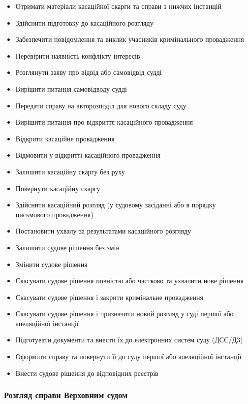 \documentclass{article}
\begin{document}
\begin{itemize}
    \item Отримати матеріали касаційної скарги та справи з нижчих інстанцій
    \item Здійснити підготовку до касаційного розгляду
    \item Забезпечити повідомлення та виклик учасників кримінального провадження
    \item Перевірити наявність конфлікту інтересів
    \item Розглянути заяву про відвід або самовідвід судді
    \item Вирішити питання самовідводу судді
    \item Передати справу на авторозподіл для нового складу суду
    \item Вирішити питання про відкриття касаційного провадження
    \item Відкрити касаційне провадження
    \item Відмовити у відкритті касаційного провадження
    \item Залишити касаційну скаргу без руху
    \item Повернути касаційну скаргу
    \item Здійснити касаційний розгляд (у судовому засіданні або в порядку письмового провадження)
    \item Постановити ухвалу за результатами касаційного розгляду
    \item Залишити судове рішення без змін
    \item Змінити судове рішення
    \item Скасувати судове рішення повністю або частково та ухвалити нове рішення
    \item Скасувати судове рішення і закрити кримінальне провадження
    \item Скасувати судове рішення і призначити новий розгляд у суді першої або апеляційної інстанції
    \item Підготувати документи та внести їх до електронних систем суду (ДСС/Д3)
    \item Оформити справу та повернути її до суду першої або апеляційної інстанції
    \item Внести судове рішення до відповідних реєстрів
\end{itemize}

\newpage
\subsubsection{Розгляд справи Верховним судом}
\end{document}
